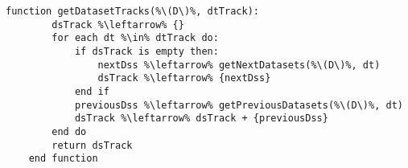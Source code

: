 
\begin{minipage}[c]{\linewidth}
\begin{lstlisting}[language=pseudocode,label={lst:algorithm-dataset-tracks},caption={[Detecção das trilhas de conjuntos de dados]Detecção do rastro do fluxo de dados no nível de trilhas de conjuntos de dados.}]
    function getDatasetTracks(%\(D\)%, dtTrack):
        dsTrack %\leftarrow% {}
        for each dt %\in% dtTrack do:
            if dsTrack is empty then:
                nextDss %\leftarrow% getNextDatasets(%\(D\)%, dt)
                dsTrack %\leftarrow% {nextDss}
            end if
            previousDss %\leftarrow% getPreviousDatasets(%\(D\)%, dt)
            dsTrack %\leftarrow% dsTrack + {previousDss}
        end do
        return dsTrack
    end function
\end{lstlisting}
\end{minipage}


